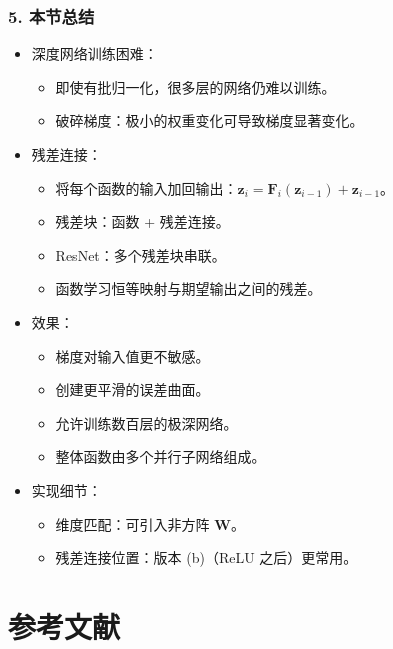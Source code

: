 \documentclass[t,aspectratio=169]{beamer} %
\begin{document}
\begin{frame}
    \frametitle{5. 本节总结}
    \begin{itemize}
        \item \alert{深度网络训练困难}：
        \begin{itemize}
            \item 即使有批归一化，很多层的网络仍难以训练。
            \item \alert{破碎梯度}：极小的权重变化可导致梯度显著变化。
        \end{itemize}
        \item \alert{残差连接}：
        \begin{itemize}
            \item 将每个函数的输入加回输出：$\mathbf{z}_i = \mathbf{F}_i(\mathbf{z}_{i-1}) + \mathbf{z}_{i-1}$。
            \item \alert{残差块}：函数 + 残差连接。
            \item \alert{ResNet}：多个残差块串联。
            \item 函数学习恒等映射与期望输出之间的\alert{残差}。
        \end{itemize}
        \item \alert{效果}：
        \begin{itemize}
            \item 梯度对输入值\alert{更不敏感}。
            \item 创建\alert{更平滑的误差曲面}。
            \item 允许训练\alert{数百层}的极深网络。
            \item 整体函数由\alert{多个并行子网络}组成。
        \end{itemize}
        \item \alert{实现细节}：
        \begin{itemize}
            \item 维度匹配：可引入非方阵 $\mathbf{W}$。
            \item 残差连接位置：版本 (b)（ReLU 之后）更常用。
        \end{itemize}
    \end{itemize}
\end{frame}

\section{参考文献}
\end{document}
